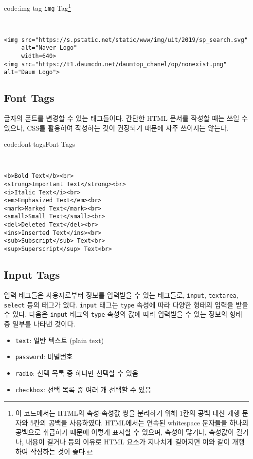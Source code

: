 \begin{codeenv}{code:img-tag}
    {\texttt{img} Tag\footnote{이 코드에서는 HTML의 속성-속성값 쌍을 분리하기 위해 1칸의 공백 대신 개행 문자와 5칸의 공백을 사용하였다. HTML에서는 연속된 whitespace 문자들을 하나의 공백으로 취급하기 때문에 이렇게 표시할 수 있으며, 속성이 많거나, 속성값이 길거나, 내용이 길거나 등의 이유로 HTML 요소가 지나치게 길어지면 이와 같이 개행하여 작성하는 것이 좋다.}}
    \begin{verbatim}


<img src="https://s.pstatic.net/static/www/img/uit/2019/sp_search.svg"
     alt="Naver Logo"
     width=640>
<img src="https://t1.daumcdn.net/daumtop_chanel/op/nonexist.png" alt="Daum Logo">
\end{verbatim}
\end{codeenv}

\subsection*{Font Tags}
글자의 폰트를 변경할 수 있는 태그들이다. 간단한 HTML 문서를 작성할 때는 쓰일 수 있으나, CSS를 활용하여 작성하는 것이 권장되기 때문에 자주 쓰이지는 않는다. 

\begin{codeenv}{code:font-tags}{Font Tags}\begin{verbatim}


<b>Bold Text</b><br>
<strong>Important Text</strong><br>
<i>Italic Text</i><br>
<em>Emphasized Text</em><br>
<mark>Marked Text</mark><br>
<small>Small Text</small><br>
<del>Deleted Text</del><br>
<ins>Inserted Text</ins><br>
<sub>Subscript</sub> Text<br>
<sup>Superscript</sup> Text<br>
\end{verbatim}
\end{codeenv}

\subsection*{Input Tags}
입력 태그들은 사용자로부터 정보를 입력받을 수 있는 태그들로, \verb|input|, \verb|textarea|, \verb|select| 등의 태그가 있다. \verb|input| 태그는 \verb|type| 속성에 따라 다양한 형태의 입력을 받을 수 있다. 다음은 \verb|input| 태그의 \verb|type| 속성의 값에 따라 입력받을 수 있는 정보의 형태 중 일부를 나타낸 것이다.

\begin{itemize}
    \item \verb|text|: 일반 텍스트 (plain text)
    \item \verb|password|: 비밀번호
    \item \verb|radio|: 선택 목록 중 하나만 선택할 수 있음
    \item \verb|checkbox|: 선택 목록 중 여러 개 선택할 수 있음
\end{itemize}

